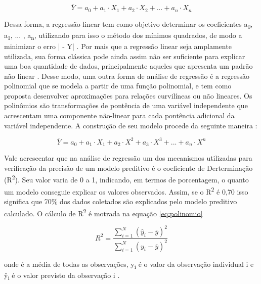 \begin{equation}
\label{eq:linear} 
 \overline{Y} = a_0 + a_1 \cdot X_1 + a_2 \cdot X_2 + ... + a_n \cdot X_n
\end{equation}

Dessa forma, a regressão linear tem como objetivo determinar os coeficientes a\textsubscript{0}, a\textsubscript{1}, ... , a\textsubscript{n}, utilizando para isso o método dos mínimos quadrados, de modo a minimizar o erro | - Y| \cite{koh2007}. Por mais que a regressão linear seja amplamente utilizada, sua forma clássica pode ainda assim não ser suficiente para explicar uma boa quantidade de dados, principalmente aqueles que apresenta um padrão não linear \cite{pantula}. Desse modo, uma outra forma de análise de regressão é a regressão polinomial que se modela a partir de uma função polinomial, e tem como proposta desenvolver aproximações para relações curvilíneas ou não lineares. Os polinômios são transformações de pontência de uma variável independente que acrescentam uma componente não-linear para cada pontência adicional da variável independente. A construção de seu modelo procede da seguinte maneira \cite{hair}:

\begin{equation}
\label{eq:polinomio} 
 \overline{Y} = a_0 + a_1 \cdot X_1 + a_2 \cdot X^2 + a_3 \cdot X^3 + ... + a_n \cdot X^n
\end{equation}

Vale acrescentar que na análise de regressão um dos mecanismos utilizadas para verificação da precisão de um modelo preditivo é o coeficiente de Derterminação (R\textsuperscript{2}). Seu valor varia de 0 a 1, indicando, em termos de porcentagem, o quanto um modelo conseguie explicar os valores observados. Assim, se o R\textsuperscript{2} é 0,70 isso significa que 70\% dos dados coletados são explicados pelo modelo preditivo calculado. O cálculo de R\textsuperscript{2} é motrada na equação \ref{eq:polinomio}

\begin{equation}
\label{eq:polinomio}  
R^2 = \frac{ \sum\limits_{i=1}^{N}(\hat{y}_i - \overline{y})^2}{\sum\limits_{i=1}^{N}(y_i - \overline{y})^2}
\end{equation} 

onde  é a média de todas as observações, y\textsubscript{i} é o valor da observação individual i e \^{y}\textsubscript{i} é o valor previsto da observação i \cite{hair}.

